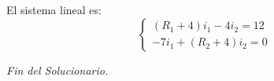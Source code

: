 \documentclass[12pt, a4paper]{article}
\begin{document}
\begin{enumerate}[leftmargin=*, itemsep=2em]
    El sistema lineal es:
    \[
    \begin{cases} 
        (R_1 + 4)i_1 - 4i_2 = 12 \\ 
        -7i_1 + (R_2 + 4)i_2 = 0 
    \end{cases}
    \]

\end{enumerate}

\vspace{1cm}
\begin{center}
    \textit{Fin del Solucionario.}
\end{center}
\end{document}
